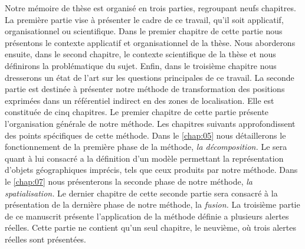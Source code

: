 

Notre mémoire de thèse est organisé en trois parties, regroupant neufs
chapitres. La première partie vise à présenter le cadre de ce travail,
qu'il soit applicatif, organisationnel ou scientifique.  Dans le
premier chapitre de cette partie nous présentons le contexte
applicatif et organisationnel de la thèse. Nous aborderons ensuite,
dans le second chapitre, le contexte scientifique de la thèse et nous
définirons la problématique du sujet. Enfin, dans le troisième
chapitre nous dresserons un état de l'art sur les questions
principales de ce travail.
%
La seconde partie est destinée à présenter notre méthode de
transformation des positions exprimées dans un référentiel indirect en
des zones de localisation. Elle est constituée de cinq chapitres. Le
premier chapitre de cette partie présente l’organisation générale de
notre méthode. Les chapitres suivants approfondissent des points
spécifiques de cette méthode. Dans le \autoref{chap:05} nous
détaillerons le fonctionnement de la première phase de la méthode,
\emph{la décomposition.} Le  sera quant à lui
consacré a la définition d'un modèle permettant la représentation
d'objets géographiques imprécis, tels que ceux produits par notre
méthode. Dans le \autoref{chap:07} nous présenterons la seconde phase
de notre méthode, \emph{la spatialisation.} Le dernier chapitre de
cette seconde partie sera consacré à la présentation de la dernière
phase de notre méthode, la \emph{fusion.}
%
La troisième partie de ce manuscrit présente l’application de la
méthode définie a plusieurs alertes réelles. Cette partie ne contient
qu'un seul chapitre, le neuvième, où trois alertes réelles sont
présentées.

